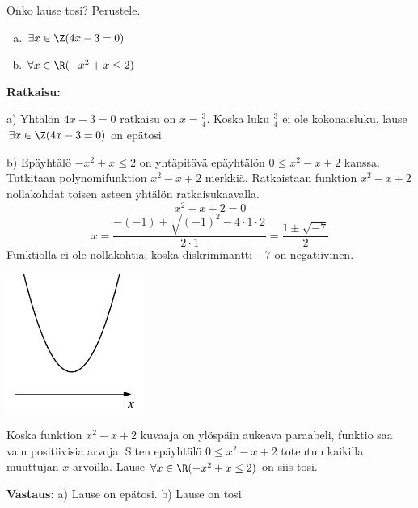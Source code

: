 \newpage

\begin{esimerkki}
Onko lause tosi? Perustele.
\begin{enumerate}[a)]
\item $\exists x\in \Z(4x - 3 = 0)$
\item $\forall x\in \R(-x^2 + x \le 2)$
\end{enumerate}

{\bf Ratkaisu:}

a) Yhtälön $4x - 3 = 0$ ratkaisu on $x = \frac{3}{4}$. Koska luku $\frac{3}{4}$ ei ole kokonaisluku, lause $\exists x\in \Z(4x - 3 = 0)$ on epätosi.

b) Epäyhtälö $-x^2+x \le 2$ on yhtäpitävä epäyhtälön $0 \le x^2 - x + 2$ kanssa. Tutkitaan polynomifunktion $x^2 - x + 2$ merkkiä. Ratkaistaan funktion $x^2 - x + 2$ nollakohdat toisen asteen yhtälön ratkaisukaavalla.
\[
x^2 - x + 2 = 0
\]
\[
x=\frac{-(-1) \pm \sqrt{(-1)^2 -4\cdot 1 \cdot 2}}{2 \cdot 1}=\frac{1 \pm \sqrt{-7}}{2}
\]
Funktiolla ei ole nollakohtia, koska diskriminantti $-7$ on negatiivinen. 

\bigskip

\begin{center}
\includegraphics[width=4.5cm]{pictures/kpl3_3_paraabeli}
\end{center}

Koska funktion $x^2 - x + 2$ kuvaaja on ylöspäin aukeava paraabeli, funktio saa vain positiivisia arvoja. Siten epäyhtälö $0 \le x^2 - x + 2$ toteutuu kaikilla muuttujan $x$ arvoilla. Lause $\forall x\in \R(-x^2 + x \le 2)$ on siis tosi.

{\bf Vastaus:} a) Lause on epätosi. b) Lause on tosi.
\end{esimerkki}

\newpage

